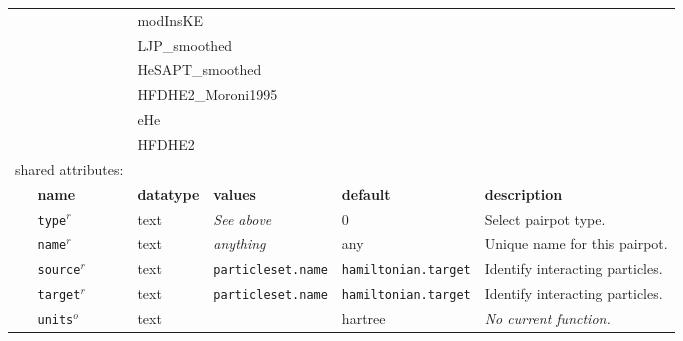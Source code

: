 \begin{table}[h]
\begin{center}
\begin{tabularx}{\textwidth}{l l l l l l }
\multicolumn{2}{l}{                } & \multicolumn{4}{l}{modInsKE}\\
\multicolumn{2}{l}{                } & \multicolumn{4}{l}{LJP\_smoothed}\\
\multicolumn{2}{l}{                } & \multicolumn{4}{l}{HeSAPT\_smoothed}\\
\multicolumn{2}{l}{                } & \multicolumn{4}{l}{HFDHE2\_Moroni1995}\\
\multicolumn{2}{l}{                } & \multicolumn{4}{l}{eHe}\\
\multicolumn{2}{l}{                } & \multicolumn{4}{l}{HFDHE2}\\
\multicolumn{2}{l}{shared attributes:} & \multicolumn{4}{l}{}\\
   &   \bfseries name     & \bfseries datatype & \bfseries values & \bfseries default   & \bfseries description \\
   &   \texttt{type}$^r$      &  text              & \textit{See above} & 0                   & Select pairpot type.         \\
   &   \texttt{name}$^r$      &  text              & \textit{anything}                 & any                 & Unique name for this pairpot.\\
   &   \texttt{source}$^r$    &  text              & \texttt{particleset.name} &\texttt{hamiltonian.target}& Identify interacting particles.\\
   &   \texttt{target}$^r$    &  text              & \texttt{particleset.name} &\texttt{hamiltonian.target}& Identify interacting particles.  \\
   &   \texttt{units}$^o$     &  text              &                  & hartree             & \textit{No current function.}  \\
\hline
\end{tabularx}
\end{center}
\end{table}
\FloatBarrier


